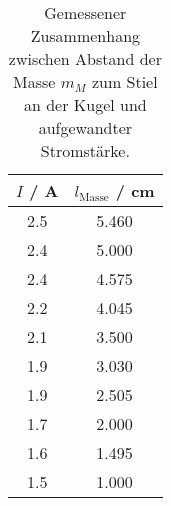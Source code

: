 \begin{table}[!htp]
\centering
\caption{Gemessener Zusammenhang zwischen Abstand der Masse $m_M$ zum Stiel an der Kugel und aufgewandter Stromstärke.}
\label{tab:gravi}
\begin{tabular}{c c}
\toprule
{$I$ / A} & {$l_\text{Masse}$ / cm} \\
\midrule
2.5 & 5.460 \\
2.4 & 5.000 \\
2.4 & 4.575 \\
2.2 & 4.045 \\
2.1 & 3.500 \\
1.9 & 3.030 \\
1.9 & 2.505 \\
1.7 & 2.000 \\
1.6 & 1.495 \\
1.5 & 1.000 \\
\bottomrule
\end{tabular}
\end{table}